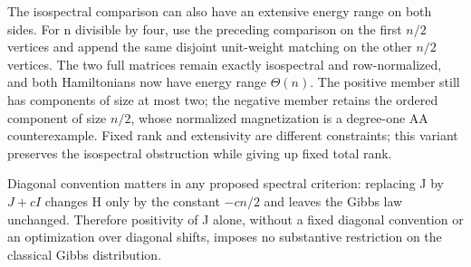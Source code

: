 The isospectral comparison can also have an extensive energy range on
both sides. For n divisible by four, use the preceding comparison on the
first \(n/2\) vertices and append the same disjoint unit-weight matching
on the other \(n/2\) vertices. The two full matrices remain exactly
isospectral and row-normalized, and both Hamiltonians now have energy
range \(\Theta (n)\). The positive member still has components of size
at most two; the negative member retains the ordered component of size
\(n/2\), whose normalized magnetization is a degree-one AA
counterexample. Fixed rank and extensivity are different constraints;
this variant preserves the isospectral obstruction while giving up fixed
total rank.

Diagonal convention matters in any proposed spectral criterion:
replacing J by \(J+cI\) changes H only by the constant \(-cn/2\) and
leaves the Gibbs law unchanged. Therefore positivity of J alone, without
a fixed diagonal convention or an optimization over diagonal shifts,
imposes no substantive restriction on the classical Gibbs distribution.
